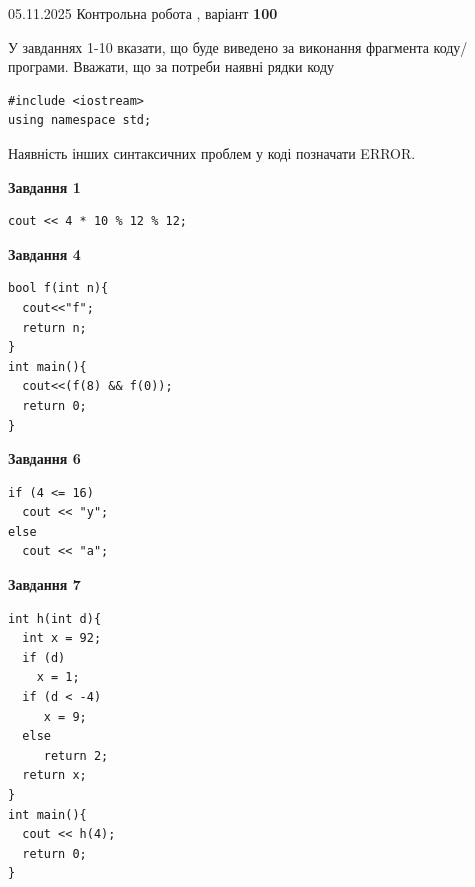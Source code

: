 \documentclass[12pt, ukrainian]{article}
\begin{document}
{\Large{05.11.2025 Контрольна робота , варіант  \No \textbf { 100 }\par}}
{
\begin {large}
У завданнях 1-10 вказати, що буде виведено за виконання фрагмента коду/про\-гра\-ми.
Вважати, що за потреби наявні рядки коду
\begin{verbatim}
#include <iostream>
using namespace std;
\end{verbatim}
Наявність інших синтаксичних проблем у коді позначати ERROR.

\begin{minipage}[t]{7.0cm}

\begin{center}
\textbf{Завдання 1}
\end{center}
\vspace{-8mm}

\begin{verbatim}
cout << 4 * 10 % 12 % 12;
\end{verbatim}



\begin{center}
\textbf{Завдання 4}
\end{center}
\vspace{-8mm}

\begin{verbatim}
bool f(int n){
  cout<<"f";
  return n;
}
int main(){
  cout<<(f(8) && f(0));
  return 0;
}
\end{verbatim}



\begin{center}
\textbf{Завдання 6}
\end{center}
\vspace{-8mm}

\begin{verbatim}
if (4 <= 16)
  cout << "y";
else
  cout << "a";
\end{verbatim}



\begin{center}
\textbf{Завдання 7}
\end{center}
\vspace{-8mm}

\begin{verbatim}
int h(int d){
  int x = 92;
  if (d)
    x = 1;
  if (d < -4)
     x = 9;
  else
     return 2;
  return x;
}
int main(){
  cout << h(4);
  return 0;
}
\end{verbatim}


\end{minipage}
\end{large}}
\end{document}

